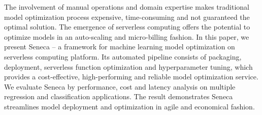 The involvement of manual operations and domain expertise makes traditional model optimization process expensive, time-consuming and not guaranteed the optimal solution. The emergence of serverless computing offers the potential to optimize models in an auto-scaling and micro-billing fashion. In this paper, we present Seneca -- a framework for machine learning model optimization on serverless computing platform. Its automated pipeline consists of packaging, deployment, serverless function optimization and hyperparameter tuning, which provides a cost-effective, high-performing and reliable model optimization service. We evaluate Seneca by performance, cost and latency analysis on multiple regression and classification applications. The result demonstrates Seneca streamlines model deployment and optimization in agile and economical fashion.
